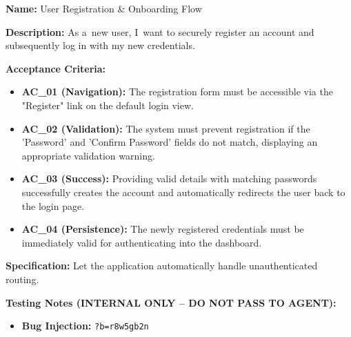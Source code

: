 \documentclass[czech, ing, kiv, he, iso690numb, viewonly]{fasthesis}
\begin{document}
\begin{tcolorbox}[breakable, colback=gray!4, colframe=black!35, boxrule=0.4pt, arc=2pt, boxsep=1pt, left=3pt, right=3pt, top=2pt, bottom=2pt, before skip=6pt, after skip=6pt, fontupper=\small, title={US-01 -- User Registration \& Onboarding Flow}]
\textbf{Name:} User Registration \& Onboarding Flow

\textbf{Description:} As a~new user, I~want to securely register an account and subsequently log in with my new credentials.

\textbf{Acceptance Criteria:}
\begin{itemize}
    \item \textbf{AC\_01 (Navigation):} The registration form must be accessible via the "Register" link on the default login view.
    \item \textbf{AC\_02 (Validation):} The system must prevent registration if the 'Password' and 'Confirm Password' fields do not match, displaying an appropriate validation warning.
    \item \textbf{AC\_03 (Success):} Providing valid details with matching passwords successfully creates the account and automatically redirects the user back to the login page.
    \item \textbf{AC\_04 (Persistence):} The newly registered credentials must be immediately valid for authenticating into the dashboard.
\end{itemize}

\textbf{Specification:} Let the application automatically handle unauthenticated routing.

\textbf{\textcolor{BrickRed}{Testing Notes (INTERNAL ONLY -- DO NOT PASS TO AGENT):}}
\begin{itemize}
    \item \textbf{Bug Injection:} \texttt{?b=r8w5gb2n}
\end{itemize}
\end{tcolorbox}
\end{document}

